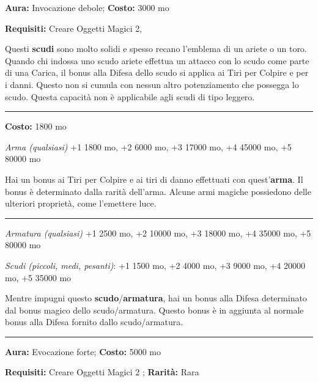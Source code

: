 \begin{multicols}{2}
\textbf{Aura:} Invocazione debole; \textbf{Costo:} 3000 mo

\textbf{Requisiti:} Creare Oggetti Magici 2,

Questi \textbf{scudi} sono molto solidi e spesso recano l'emblema di un ariete o un toro. Quando chi indossa uno scudo ariete effettua un attacco con lo scudo come parte di una Carica, il bonus alla Difesa dello scudo si applica ai Tiri per Colpire e per i danni. Questo non si cumula con nessun altro potenziamento che possegga lo scudo. Questa capacità non è applicabile agli scudi di tipo leggero.

\smallskip\noindent\rule{\linewidth}{2pt}  \hypertarget{Armamagica}{}\medskip{}\noindent\label{Armamagica}

\textbf{Costo:} 1800 mo

\emph{Arma (qualsiasi)} +1 1800 mo, +2 6000 mo, +3 17000 mo, +4 45000 mo, +5 80000 mo

Hai un bonus ai Tiri per Colpire e ai tiri di danno effettuati con quest'\textbf{arma}. Il bonus è determinato dalla rarità dell'arma. Alcune armi magiche possiedono delle ulteriori proprietà, come l'emettere luce.

\smallskip\noindent\rule{\linewidth}{2pt}  \hypertarget{Armatura/ScudoMagico}{}\medskip{}\noindent\label{Armatura/ScudoMagico}

\emph{Armatura (qualsiasi)} +1 2500 mo, +2 10000 mo, +3 18000 mo, +4 35000 mo, +5 80000 mo

\emph{Scudi (piccoli, medi, pesanti)}: +1 1500 mo, +2 4000 mo, +3 9000 mo, +4 20000 mo, +5 35000 mo

Mentre impugni questo \textbf{scudo}/\textbf{armatura}, hai un bonus alla Difesa determinato dal bonus magico dello scudo/armatura. Questo bonus è in aggiunta al normale bonus alla Difesa fornito dallo scudo/armatura.

\smallskip\noindent\rule{\linewidth}{2pt}  \hypertarget{ArmaturaDemoniaca}{}\medskip{}\noindent\label{ArmaturaDemoniaca}

\textbf{Aura:} Evocazione forte; \textbf{Costo:} 5000 mo

\textbf{Requisiti:} Creare Oggetti Magici 2 ; \textbf{Rarità:} Rara


\end{multicols}
